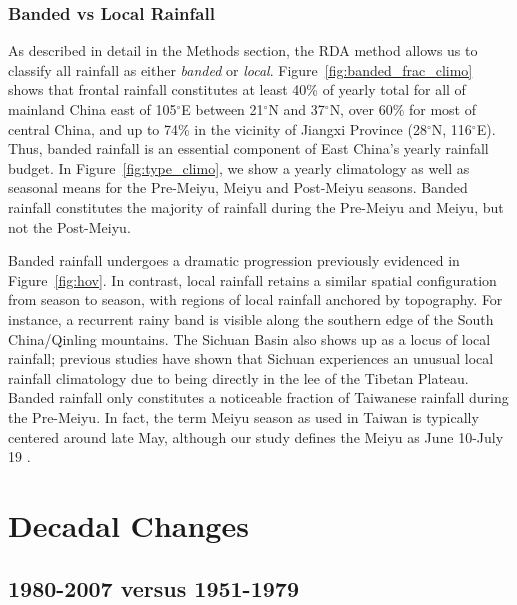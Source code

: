 \documentclass[9pt,twocolumn,twoside,lineno]{pnas-new}
\begin{document}
\subsubsection{Banded vs Local Rainfall}	
	
	As described in detail in the Methods section, the RDA method allows us to classify all rainfall as either \textit{banded} or \textit{local}. Figure~\ref{fig:banded_frac_climo} shows that frontal rainfall constitutes at least 40\% of yearly total for all of mainland China east of 105$^\circ$E between 21$^\circ$N and 37$^\circ$N, over 60\% for most of central China, and up to 74\% in the vicinity of Jiangxi Province (28$^\circ$N, 116$^\circ$E). Thus, banded rainfall is an essential component of East China's yearly rainfall budget. In Figure~\ref{fig:type_climo}, we show a yearly climatology as well as seasonal means for the Pre-Meiyu, Meiyu and Post-Meiyu seasons. Banded rainfall constitutes the majority of rainfall during the Pre-Meiyu and Meiyu, but not the Post-Meiyu. 

	Banded rainfall undergoes a dramatic progression previously evidenced in Figure~\ref{fig:hov}. In contrast, local rainfall retains a similar spatial configuration from season to season, with regions of local rainfall anchored by topography. For instance, a recurrent rainy band is visible along the southern edge of the South China/Qinling mountains. The Sichuan Basin also shows up as a locus of local rainfall; previous studies have shown that Sichuan experiences an unusual local rainfall climatology due to being directly in the lee of the Tibetan Plateau. Banded rainfall only constitutes a noticeable fraction of Taiwanese rainfall during the Pre-Meiyu. In fact, the term Meiyu season as used in Taiwan is typically centered around late May, although our study defines the Meiyu as June 10-July 19 \citep{Chen1994,Xu2009}.

\section{Decadal Changes}

\subsection{1980-2007 versus 1951-1979}
\end{document}
